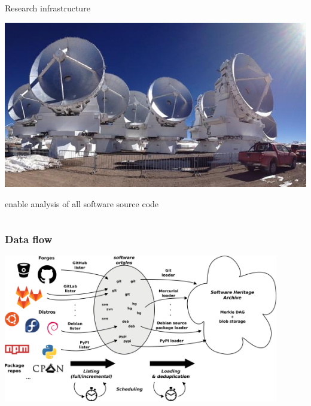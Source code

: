 \documentclass[aspectratio=169,xcolor=table]{beamer}
\begin{document}
\begin{frame}
\begin{columns}
\begin{column}{.3\columnwidth}
\begin{block}{Research infrastructure}
\begin{center}
                        \includegraphics[width=.7\linewidth]{img/atacama-telescope}
                    \end{center}
                    \alert{enable analysis} of all software source code
                \end{block}
            \end{column}
        \end{columns}
    \end{frame}

    \begin{frame}
        \frametitle{Data flow}
        \begin{center}
            \includegraphics[width=0.9\textwidth]{img/swh-dataflow.pdf}
        \end{center}
    \end{frame}
\end{document}
